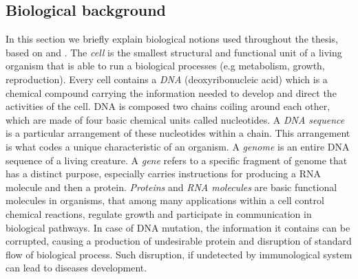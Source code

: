 \documentclass[12pt, wide]{mwart}
\begin{document}
\subsection{Biological background} \label{section:bio}
In this section we briefly explain biological notions used throughout the thesis, based on \cite{NHGRI} and \cite[chapters~11,12]{GeneExpr}. The \textit{cell} is the smallest structural and functional unit of a living organism that is able to run a biological processes (e.g metabolism, growth, reproduction). Every cell contains a \textit{DNA} (deoxyribonucleic acid) which is a chemical compound carrying the information needed to develop and direct the activities of the cell. DNA is composed two chains coiling around each other, which are made of four basic chemical units called nucleotides. A \textit{DNA sequence} is a particular arrangement of these nucleotides within a chain. This arrangement is what codes a unique characteristic of an organism. A \textit{genome} is an entire DNA sequence of a living creature. A \textit{gene} refers to a specific fragment of genome that has a distinct purpose, especially carries instructions for producing a RNA molecule and then a protein. \textit{Proteins} and \textit{RNA molecules} are basic functional molecules in organisms, that among many applications within a cell control chemical reactions, regulate growth and participate in communication in biological pathways. In case of DNA mutation, the information it contains can be corrupted, causing a production of undesirable protein and disruption of standard flow of biological process. Such disruption, if undetected by immunological system can lead to diseases development.
\end{document}
